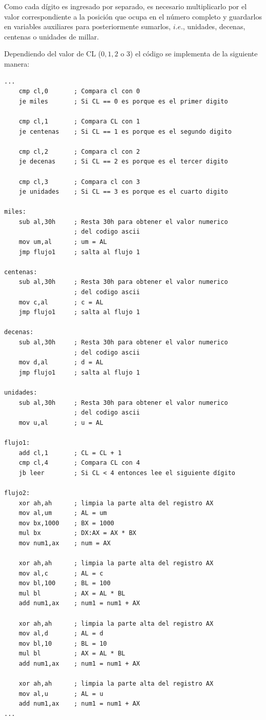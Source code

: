 \documentclass[letter,12 pt,titlepage]{article}
\begin{document}
    Como cada dígito es ingresado por separado, es necesario multiplicarlo por el valor correspondiente a la posición que ocupa en el número completo y guardarlos en variables auxiliares para posteriormente sumarlos, $i.e.$, unidades, decenas, centenas o unidades de millar.

    Dependiendo del valor de CL ($0, 1, 2$ o $3$) el código se implementa de la siguiente manera:

    \begin{verbatim}
...
    cmp cl,0       ; Compara cl con 0
    je miles       ; Si CL == 0 es porque es el primer digito

    cmp cl,1       ; Compara CL con 1
    je centenas    ; Si CL == 1 es porque es el segundo digito

    cmp cl,2       ; Compara cl con 2
    je decenas     ; Si CL == 2 es porque es el tercer digito

    cmp cl,3       ; Compara cl con 3
    je unidades    ; Si CL == 3 es porque es el cuarto digito

miles:
    sub al,30h     ; Resta 30h para obtener el valor numerico 
                   ; del codigo ascii
    mov um,al      ; um = AL
    jmp flujo1     ; salta al flujo 1

centenas:
    sub al,30h     ; Resta 30h para obtener el valor numerico 
                   ; del codigo ascii
    mov c,al       ; c = AL
    jmp flujo1     ; salta al flujo 1

decenas:
    sub al,30h     ; Resta 30h para obtener el valor numerico 
                   ; del codigo ascii
    mov d,al       ; d = AL
    jmp flujo1     ; salta al flujo 1

unidades:
    sub al,30h     ; Resta 30h para obtener el valor numerico 
                   ; del codigo ascii
    mov u,al       ; u = AL

flujo1:
    add cl,1       ; CL = CL + 1
    cmp cl,4       ; Compara CL con 4
    jb leer        ; Si CL < 4 entonces lee el siguiente dígito

flujo2:
    xor ah,ah      ; limpia la parte alta del registro AX
    mov al,um      ; AL = um
    mov bx,1000    ; BX = 1000
    mul bx         ; DX:AX = AX * BX
    mov num1,ax    ; num = AX

    xor ah,ah      ; limpia la parte alta del registro AX
    mov al,c       ; AL = c
    mov bl,100     ; BL = 100
    mul bl         ; AX = AL * BL
    add num1,ax    ; num1 = num1 + AX

    xor ah,ah      ; limpia la parte alta del registro AX
    mov al,d       ; AL = d
    mov bl,10      ; BL = 10
    mul bl         ; AX = AL * BL
    add num1,ax    ; num1 = num1 + AX

    xor ah,ah      ; limpia la parte alta del registro AX
    mov al,u       ; AL = u
    add num1,ax    ; num1 = num1 + AX
...
    \end{verbatim}
\end{document}
